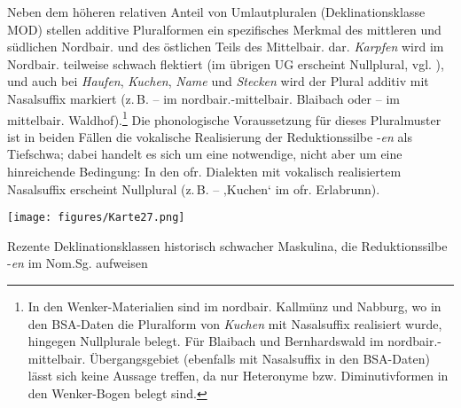 Neben dem höheren relativen Anteil von Umlautpluralen (Deklinationsklasse MOD) stellen additive Pluralformen ein spezifisches Merkmal des mittleren und südlichen Nordbair. und des östlichen Teils des Mittelbair. dar. \textit{Karpfen} wird im Nordbair. teilweise schwach flektiert (im übrigen UG erscheint Nullplural, vgl. ), und auch bei \textit{Haufen}, \textit{Kuchen}, \textit{Name} und \textit{Stecken} wird der Plural additiv mit Nasalsuffix markiert (z.\,B.  --  im nordbair.-mittelbair. Blaibach oder  --  im mittelbair. Waldhof).{\footnote{In den Wenker-Materialien sind im nordbair. Kallmünz und Nabburg, wo in den BSA-Daten die Pluralform von \textit{Kuchen} mit Nasalsuffix realisiert wurde, hingegen Nullplurale belegt. Für Blaibach und Bernhardswald im nordbair.-mittelbair. Übergangsgebiet (ebenfalls mit Nasalsuffix in den BSA-Daten) lässt sich keine Aussage treffen, da nur Heteronyme bzw. Diminutivformen in den Wenker-Bogen belegt sind.}} Die phonologische Voraussetzung für dieses Pluralmuster ist in beiden Fällen die vokalische Realisierung der Reduktionssilbe -\textit{en} als Tiefschwa; dabei handelt es sich um eine notwendige, nicht aber um eine hinreichende Bedingung: In den ofr. Dialekten mit vokalisch realisiertem Nasalsuffix erscheint Nullplural (z.\,B.  --  ‚Kuchen‘ im ofr. Erlabrunn).

\begin{map}
\texttt{[image: figures/Karte27.png]}
\caption[Rezente Deklinationsklassen historisch schwacher Maskulina, die Reduktionssilbe{}-en im Nom.Sg. aufweisen ]{\label{bkm:Ref53827307}\hypertarget{Toc81223976}{}Rezente Deklinationsklassen historisch schwacher Maskulina, die Reduktionssilbe -\textit{en} im Nom.Sg. aufweisen}
\label{map:27}
\end{map}

